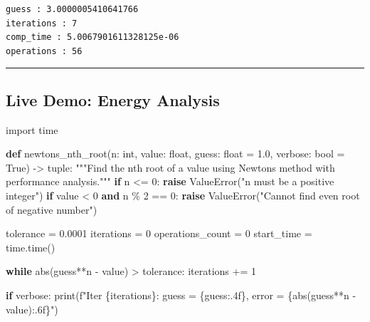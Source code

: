 \documentclass[
  letterpaper,
  DIV=11,
  numbers=noendperiod]{scrartcl}
\newenvironment{Shaded}{\begin{snugshade}}{\end{snugshade}}
\newcommand{\BuiltInTok}[1]{\textcolor[rgb]{0.00,0.23,0.31}{#1}}
\newcommand{\CommentTok}[1]{\textcolor[rgb]{0.37,0.37,0.37}{#1}}
\newcommand{\ControlFlowTok}[1]{\textcolor[rgb]{0.00,0.23,0.31}{\textbf{#1}}}
\newcommand{\DecValTok}[1]{\textcolor[rgb]{0.68,0.00,0.00}{#1}}
\newcommand{\FloatTok}[1]{\textcolor[rgb]{0.68,0.00,0.00}{#1}}
\newcommand{\ImportTok}[1]{\textcolor[rgb]{0.00,0.46,0.62}{#1}}
\newcommand{\KeywordTok}[1]{\textcolor[rgb]{0.00,0.23,0.31}{\textbf{#1}}}
\newcommand{\NormalTok}[1]{\textcolor[rgb]{0.00,0.23,0.31}{#1}}
\newcommand{\OperatorTok}[1]{\textcolor[rgb]{0.37,0.37,0.37}{#1}}
\newcommand{\PreprocessorTok}[1]{\textcolor[rgb]{0.68,0.00,0.00}{#1}}
\newcommand{\SpecialCharTok}[1]{\textcolor[rgb]{0.37,0.37,0.37}{#1}}
\newcommand{\SpecialStringTok}[1]{\textcolor[rgb]{0.13,0.47,0.30}{#1}}
\newcommand{\StringTok}[1]{\textcolor[rgb]{0.13,0.47,0.30}{#1}}
\newcommand{\VariableTok}[1]{\textcolor[rgb]{0.07,0.07,0.07}{#1}}
\begin{document}
\begin{verbatim}
guess : 3.0000005410641766
iterations : 7
comp_time : 5.0067901611328125e-06
operations : 56
\end{verbatim}

\begin{center}\rule{0.5\linewidth}{0.5pt}\end{center}

\subsection{Live Demo: Energy Analysis}\label{live-demo-energy-analysis}

\begin{Shaded}
\begin{Highlighting}[]
\ImportTok{import}\NormalTok{ time}

\KeywordTok{def}\NormalTok{ newtons\_nth\_root(n: }\BuiltInTok{int}\NormalTok{, value: }\BuiltInTok{float}\NormalTok{, guess: }\BuiltInTok{float} \OperatorTok{=} \FloatTok{1.0}\NormalTok{, verbose: }\BuiltInTok{bool} \OperatorTok{=} \VariableTok{True}\NormalTok{) }\OperatorTok{{-}\textgreater{}} \BuiltInTok{tuple}\NormalTok{:}
    \CommentTok{"""Find the nth root of a value using Newton\textquotesingle{}s method with performance analysis."""}
    \ControlFlowTok{if}\NormalTok{ n }\OperatorTok{\textless{}=} \DecValTok{0}\NormalTok{:}
        \ControlFlowTok{raise} \PreprocessorTok{ValueError}\NormalTok{(}\StringTok{"n must be a positive integer"}\NormalTok{)}
    \ControlFlowTok{if}\NormalTok{ value }\OperatorTok{\textless{}} \DecValTok{0} \KeywordTok{and}\NormalTok{ n }\OperatorTok{\%} \DecValTok{2} \OperatorTok{==} \DecValTok{0}\NormalTok{:}
        \ControlFlowTok{raise} \PreprocessorTok{ValueError}\NormalTok{(}\StringTok{"Cannot find even root of negative number"}\NormalTok{)}
    
\NormalTok{    tolerance }\OperatorTok{=} \FloatTok{0.0001}
\NormalTok{    iterations }\OperatorTok{=} \DecValTok{0}
\NormalTok{    operations\_count }\OperatorTok{=} \DecValTok{0}
\NormalTok{    start\_time }\OperatorTok{=}\NormalTok{ time.time()}
    
    \ControlFlowTok{while} \BuiltInTok{abs}\NormalTok{(guess}\OperatorTok{**}\NormalTok{n }\OperatorTok{{-}}\NormalTok{ value) }\OperatorTok{\textgreater{}}\NormalTok{ tolerance:}
\NormalTok{        iterations }\OperatorTok{+=} \DecValTok{1}
        
        \ControlFlowTok{if}\NormalTok{ verbose:}
            \BuiltInTok{print}\NormalTok{(}\SpecialStringTok{f"Iter }\SpecialCharTok{\{}\NormalTok{iterations}\SpecialCharTok{\}}\SpecialStringTok{: guess = }\SpecialCharTok{\{}\NormalTok{guess}\SpecialCharTok{:.4f\}}\SpecialStringTok{, error = }\SpecialCharTok{\{}\BuiltInTok{abs}\NormalTok{(guess}\OperatorTok{**}\NormalTok{n }\OperatorTok{{-}}\NormalTok{ value)}\SpecialCharTok{:.6f\}}\SpecialStringTok{"}\NormalTok{)}
        

\end{Highlighting}
\end{Shaded}
\end{document}
